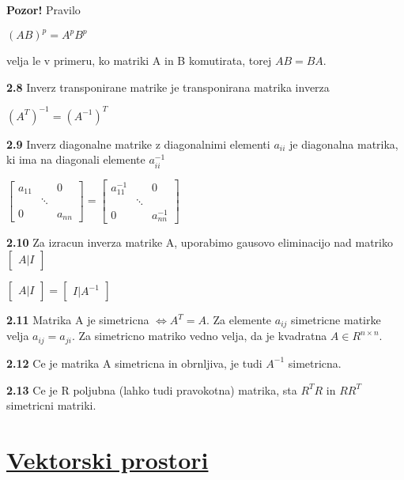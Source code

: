 \documentclass{article}
\begin{document}
\begin{multicols}{4}
\textbf{Pozor!} Pravilo
\begin{center}
    $(AB)^{p} = A^{p}B^{p}$
\end{center}
velja le v primeru, ko matriki A in B komutirata, torej $AB = BA$.

\textbf{2.8} Inverz transponirane matrike je transponirana matrika inverza
\begin{center}
    $(A^{T})^{-1} = (A^{-1})^{T}$
\end{center}

\textbf{2.9} Inverz diagonalne matrike z diagonalnimi elementi $a_{ii}$ je
diagonalna matrika, ki ima na diagonali elemente $a_{ii}^{-1}$
\begin{center}
    $\begin{bmatrix}
        a_{11} &        & 0\\
               & \ddots &\\
        0      &        & a_{nn}
    \end{bmatrix}=
    \begin{bmatrix}
        a_{11}^{-1} &        & 0\\
                    & \ddots &\\
        0           &        & a_{nn}^{-1}
    \end{bmatrix}
    $
\end{center}

\textbf{2.10} Za izracun inverza matrike A, uporabimo gausovo eliminacijo nad
matriko $\begin{bmatrix}A|I\end{bmatrix}$
\begin{center}
    $\begin{bmatrix}A|I\end{bmatrix} =
    \begin{bmatrix}I|A^{-1}\end{bmatrix}
    $
\end{center}

\textbf{2.11} Matrika A je simetricna $\Leftrightarrow A^{T} = A$. Za elemente
$a_{ij}$ simetricne matirke velja $a_{ij} = a_{ji}$. Za simetricno matriko vedno velja,
da je kvadratna $A \in R^{n \times n}$.

\textbf{2.12} Ce je matrika A simetricna in obrnljiva, je tudi $A^{-1}$ simetricna.

\textbf{2.13} Ce je R poljubna (lahko tudi pravokotna) matrika, sta $R^{T}R$ in
$RR^{T}$ simetricni matriki.

\section{\underline{Vektorski prostori}}


\end{multicols}
\end{document}
